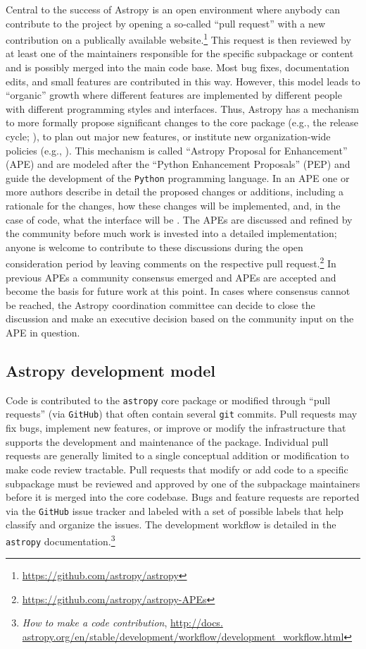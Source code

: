 \documentclass[modern]{aastex61}
\newcommand{\package}[1]{\texttt{#1}\xspace}
\newcommand{\github}{\package{GitHub}}
\newcommand{\python}{\package{Python}}
\newcommand{\astropy}{Astropy\xspace}
\newcommand{\astropypkg}{\package{astropy}}
\begin{document}
Central to the success of \astropy is an open environment where anybody can
contribute to the project by opening a so-called ``pull request'' with a new
contribution on a publically available
website.\footnote{\url{https://github.com/astropy/astropy}}
This request is then reviewed by at least one of the maintainers responsible for
the specific subpackage or content and is possibly merged into the main code
base.
Most bug fixes, documentation edits, and small features are contributed in this
way.
However, this model leads to ``organic'' growth where different features are
implemented by different people with different programming styles and
interfaces.
Thus, \astropy has a mechanism to more formally propose significant changes to
the core package (e.g., the release cycle; \citealt{ape2}), to plan out major
new features, or institute new organization-wide policies (e.g.,
\citealt{ape8}).
This mechanism is called ``Astropy Proposal for Enhancement'' (APE) and are
modeled after the ``Python Enhancement Proposals'' (PEP) and guide the
development of the \python programming language.
In an APE one or more authors describe in detail the proposed changes or
additions, including a rationale for the changes, how these changes will be
implemented, and, in the case of code, what the interface will be \citep{ape1}.
The APEs are discussed and refined by the community before much work is invested
into a detailed implementation; anyone is welcome to contribute to these
discussions during the open consideration period by leaving comments on the
respective pull request.\footnote{\url{https://github.com/astropy/astropy-APEs}}
In previous APEs a community consensus emerged and APEs are accepted and become
the basis for future work at this point.
In cases where consensus cannot be reached, the
\astropy coordination committee can decide to close the discussion and
make an executive decision based on the community input on the APE in question.

\subsection{Astropy development model}

Code is contributed to the \astropypkg core package or modified through ``pull
requests'' (via \github) that often contain several \texttt{git} commits.
Pull requests may fix bugs, implement new features, or improve or modify the
infrastructure that supports the development and maintenance of the package.
Individual pull requests are generally limited to a single conceptual addition
or modification to make code review tractable.
Pull requests that modify or add code to a specific subpackage must be reviewed
and approved by one of the subpackage maintainers before it is merged into the
core codebase.
Bugs and feature requests are reported via the \github issue tracker and labeled
with a set of possible labels that help classify and organize the issues.
The development workflow is detailed in the \astropypkg
documentation.\footnote{\emph{How to make a code contribution}, \url{http://docs.
astropy.org/en/stable/development/workflow/development_workflow.html}}
\end{document}
